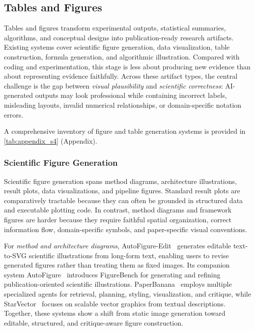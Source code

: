 \subsection{Tables and Figures}
\label{sec:figure_table}

Tables and figures transform experimental outputs, statistical summaries, algorithms, and conceptual designs into publication-ready research artifacts. Existing systems cover scientific figure generation, data visualization, table construction, formula generation, and algorithmic illustration. Compared with coding and experimentation, this stage is less about producing new evidence than about representing evidence faithfully. Across these artifact types, the central challenge is the gap between \emph{visual plausibility} and \emph{scientific correctness}: AI-generated outputs may look professional while containing incorrect labels, misleading layouts, invalid numerical relationships, or domain-specific notation errors. 

A comprehensive inventory of figure and table generation systems is provided in \cref{tab:appendix_s4} (Appendix).



\subsubsection{Scientific Figure Generation}
\label{sec:figure_gen}

Scientific figure generation spans method diagrams, architecture illustrations, result plots, data visualizations, and pipeline figures. Standard result plots are comparatively tractable because they can often be grounded in structured data and executable plotting code. In contrast, method diagrams and framework figures are harder because they require faithful spatial organization, correct information flow, domain-specific symbols, and paper-specific visual conventions.

For \emph{method and architecture diagrams}, AutoFigure-Edit~\cite{autofigure2026} generates editable text-to-SVG scientific illustrations from long-form text, enabling users to revise generated figures rather than treating them as fixed images. Its companion system AutoFigure~\cite{autofigure2026iclr} introduces FigureBench for generating and refining publication-oriented scientific illustrations. PaperBanana~\cite{paperbanana2026} employs multiple specialized agents for retrieval, planning, styling, visualization, and critique, while StarVector~\cite{starVector2025} focuses on scalable vector graphics from textual descriptions. Together, these systems show a shift from static image generation toward editable, structured, and critique-aware figure construction.

